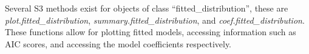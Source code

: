 Several S3 methods exist for objects of class ``fitted\_distribution'', these are \textit{plot.fitted\_distribution}, \textit{summary.fitted\_distribution}, and \textit{coef.fitted\_distribution}. These functions allow for plotting fitted models, accessing information such as AIC scores, and accessing the model coefficients respectively.
